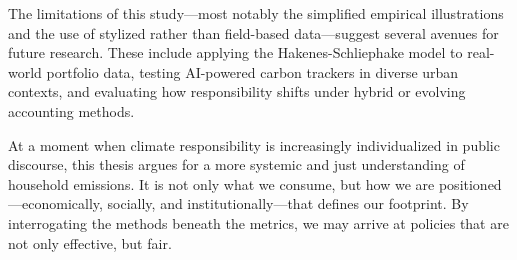\documentclass[12pt,a4paper]{article}%
\begin{document}
The limitations of this study—most notably the simplified empirical illustrations and the use of stylized rather than field-based data—suggest several avenues for future research. These include applying the Hakenes-Schliephake model to real-world portfolio data, testing AI-powered carbon trackers in diverse urban contexts, and evaluating how responsibility shifts under hybrid or evolving accounting methods.

At a moment when climate responsibility is increasingly individualized in public discourse, this thesis argues for a more systemic and just understanding of household emissions. It is not only what we consume, but how we are positioned—economically, socially, and institutionally—that defines our footprint. By interrogating the methods beneath the metrics, we may arrive at policies that are not only effective, but fair.
\end{document}
